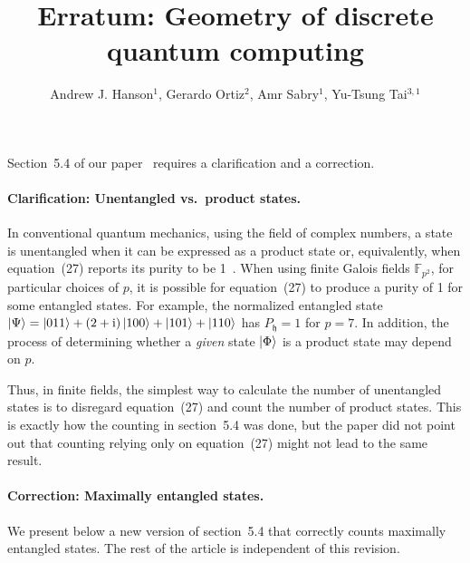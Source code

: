 \documentclass[12pt]{iopart}
\newcommand{\ff}[1]{\mathbb{F}_{#1}}
\def\fh{\mathfrak{h}}
\begin{document}
\title{Erratum: Geometry of discrete quantum computing}

\author{Andrew J. Hanson$^{1}$, Gerardo Ortiz$^{2}$, Amr Sabry$^{1}$,
Yu-Tsung Tai$^{3,1}$}


\address{$^{1}$ School of Informatics and Computing, Indiana University,
Bloomington, IN 47405, U.S.A}


\address{$^{2}$ Department of Physics, Indiana University, Bloomington, IN
47405, U.S.A}


\address{$^{3}$ Department of Mathematics, Indiana University, Bloomington,
IN 47405, U.S.A}



\submitto{\jpa}

\maketitle

\noindent Section~5.4 of our paper~\cite{geometry} requires a clarification and a correction.

\paragraph*{Clarification: Unentangled vs.\ product states.}
In conventional quantum mechanics, using the field of complex numbers, a state is unentangled when it can be expressed as a product state or, equivalently, when equation~(27) reports its purity to be 1~\cite{PhysRevLett.92.107902, PhysRevA.68.032308}. When using finite Galois fields $\ff{p^2}$, for particular choices of $p$, it is possible for equation~(27) to produce a purity of 1 for some entangled states. For example, the normalized entangled state $\ket{\Psi} = \ket{011}+\left(2+\mathrm{i}\right)\ket{100}+\ket{101}+\ket{110}$ has $P_{\fh}=1$ for $p=7$. In addition, the process of determining whether a \emph{given} state $\ket{\Phi}$ is a product state may depend on $p$. 

Thus, in finite fields, the simplest way to calculate the number of
unentangled states is to disregard equation~(27) and count the number
of product states. This is exactly how the counting in section~5.4
was done, but the paper did not point out that counting relying only on equation~(27) might not lead to the same result.

\paragraph*{Correction: Maximally entangled states.}
We present below a new version of section~5.4 that correctly counts maximally entangled states. The rest of the article is independent of this revision.
\end{document}
